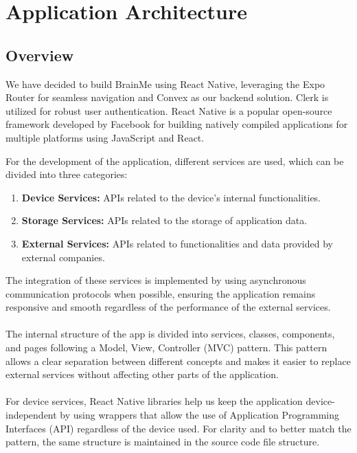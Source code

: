 \section{Application Architecture}

\subsection{Overview}

We have decided to build BrainMe using React Native, leveraging the Expo Router for seamless navigation and Convex as our backend solution. Clerk is utilized for robust user authentication. React Native is a popular open-source framework developed by Facebook for building natively compiled applications for multiple platforms using JavaScript and React.

For the development of the application, different services are used, which can be divided into three categories:
\begin{enumerate}
\item \textbf{Device Services:} APIs related to the device's internal functionalities.
\item \textbf{Storage Services:} APIs related to the storage of application data.
\item \textbf{External Services:} APIs related to functionalities and data provided by external companies.
\end{enumerate}

The integration of these services is implemented by using asynchronous communication protocols when possible, ensuring the application remains responsive and smooth regardless of the performance of the external services. \\\\
The internal structure of the app is divided into services, classes, components, and pages following a Model, View, Controller (MVC) pattern. This pattern allows a clear separation between different concepts and makes it easier to replace external services without affecting other parts of the application. \\\\
For device services, React Native libraries help us keep the application device-independent by using wrappers that allow the use of Application Programming Interfaces (API) regardless of the device used. For clarity and to better match the pattern, the same structure is maintained in the source code file structure.

